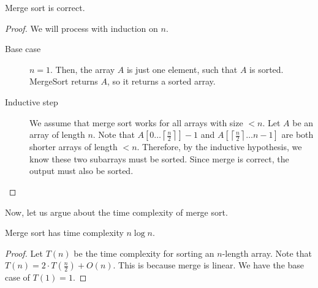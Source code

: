 \begin{theorem}
	Merge sort is correct.
\end{theorem}
\begin{proof}
	We will process with induction on \( n \).
	\begin{description}
		\item[Base case] \( n=1 \). Then, the array \( A \) is just one element, such that \( A \) is sorted. MergeSort returns \( A \), so it returns a sorted array.
		\item[Inductive step] We assume that merge sort works for all arrays with size \( < n \). Let \( A \) be an array of length \( n \). Note that \( A[0\ldots \left\lceil \frac{n}{2} \right\rceil ]-1 \) and \( A[\left\lceil \frac{n}{2} \right\rceil \ldots n-1] \) are both shorter arrays of length \( <n \). Therefore, by the inductive hypothesis, we know these two subarrays must be sorted. Since merge is correct, the output must also be sorted.
	\end{description}
\end{proof}

Now, let us argue about the time complexity of merge sort.

\begin{theorem}
	Merge sort has time complexity \( n\log n \).
\end{theorem}
\begin{proof}
	Let \( T(n) \) be the time complexity for sorting an \( n \)-length array. Note that \( T(n)=2\cdot T(\frac{n}{2}) + O(n) \). This is because merge is linear. We have the base case of \( T(1)=1 \).
\end{proof}
